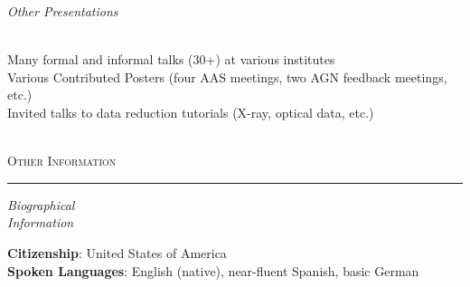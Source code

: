 \documentclass[11pt]{article}
\makeatletter
\def\vhrulefill#1{\leavevmode\leaders\hrule\@height#1\hfill \kern\z@}
\makeatother
\begin{document}
\vspace{4mm}

\hspace{2.5mm} \parbox{1.5in}{\textit{Other Presentations \\\\}} \parbox{5.15in}{
Many formal and informal talks (30+) at various institutes\\
Various Contributed Posters (four AAS meetings, two AGN feedback meetings, etc.)\\
Invited talks to data reduction tutorials (X-ray, optical data, etc.)
}\\

\textsc{Other Information} \vhrulefill{0.4pt}

\vspace{4mm}


\hspace{2.5mm} \parbox{1.5in}{\textit{Biographical \\ Information  }} \parbox{5.15in}{
\textbf{Citizenship}: United States of America\\
\textbf{Spoken Languages}: English (native), near-fluent Spanish, basic German}\\

\vspace{4mm}
\end{document}
